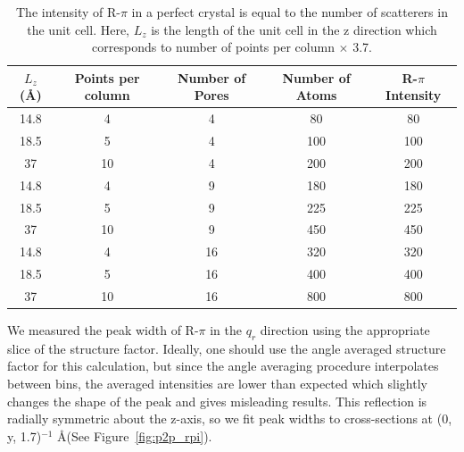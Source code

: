 \documentclass{article}
\begin{document}
  \begin{table}
  \centering
  \begin{tabular}{c c c c c}
  \toprule
  $L_z$ (\AA) & Points per column & Number of Pores &  Number of Atoms & R-$\pi$ Intensity\\ %
  \midrule
  14.8        &      4            &       4          & 80               & 80              \\ %
  18.5        &      5            &       4          & 100              & 100             \\ %
  37          &      10           &       4          & 200              & 200             \\ %
  14.8        &      4            &       9          & 180              & 180             \\ %
  18.5        &      5            &       9          & 225              & 225             \\ %
  37          &      10           &       9          & 450              & 450             \\ %
  14.8        &      4            &       16         & 320              & 320             \\ %
  18.5        &      5            &       16         & 400              & 400             \\ %
  37          &      10           &       16         & 800              & 800             \\ %
  \bottomrule
  \end{tabular}
  \caption{The intensity of R-$\pi$ in a perfect crystal is equal to the number of
  scatterers in the unit cell. Here, $L_z$ is the length of the unit cell in the z direction which
  corresponds to number of points per column $\times$ 3.7.}\label{table:perfect_size_dependence}
  \end{table}

  We measured the peak width of R-$\pi$ in the $q_r$ direction using the
  appropriate slice of the structure factor. Ideally, one should use the angle
  averaged structure factor for this calculation, but since the angle averaging
  procedure interpolates between bins, the averaged intensities are lower than
  expected which slightly changes the shape of the peak and gives misleading
  results. This reflection is radially symmetric about the z-axis, so we fit peak
  widths to cross-sections at (0, y, 1.7)$^{-1}$ \AA (See Figure~\ref{fig:p2p_rpi}). 
\end{document}
